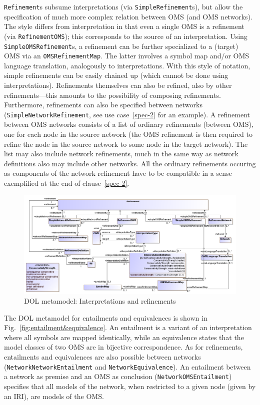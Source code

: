 \documentclass[10pt, a4paper]{isov2}
\newcommand*{\syntax}[1]{\texttt{#1}}
\begin{document}
\syntax{Refinement}s subsume interpretations (via
\syntax{SimpleRefinement}s), but allow the specification of much more
complex relation between OMS (and OMS networks).  The style differs
from interpretation in that even a single OMS is a refinement (via
\syntax{RefinementOMS}); this corresponds to the source of an
interpretation. Using \syntax{SimpleOMSRefinement}s, a refinement can
be further specialized to a (target) OMS via an
\syntax{OMSRefinementMap}. The latter involves a symbol map and/or OMS
language translation, analogously to interpretations.  With this style
of notation, simple refinements can be easily chained up (which cannot
be done using interpretations).  Refinements themselves can
also be refined, also by other refinements---this amounts
to the possibility of composing refinements. Furthermore,
refinements can also be specified between networks
(\syntax{SimpleNetworkRefinement}, see use case~\ref{spec-2} for an example).  
A refinement between OMS networks
consists of a list of ordinary refinements (between OMS), one for
each node in the source network (the OMS refinement is then required
to refine the node in the source network to some node in the target
network). The list may also include network refinements, much in the
same way as network definitions also may include other networks.
All the ordinary refinements occuring as components of the
network refinement have to be compatible in a sense exemplified
at the end of clause~\ref{spec-2}.

\medskip
\begin{figure}
  \centering
    \includegraphics[scale=0.42]{mof/interpretations&refinements.png}
  \caption{DOL metamodel: Interpretations and refinements}
  \label{fig:interpretations&refinements}
\end{figure}

The DOL metamodel for entailments and equivalences is shown in 
Fig.~\ref{fig:entailment&equivalence}.
An entailment is a variant of an interpretation where all symbols are
mapped identically, while an equivalence states that the model classes
of two OMS are in bijective correspondence. As for refinements,
entailments and equivalences are also possible between networks
(\syntax{NetworkNetworkEntailment} and \syntax{NetworkEquivalence}).
An entailment between a network as premise and an OMS as conclusion
(\syntax{NetworkOMSEntailment}) specifies that all models of the
network, when restricted to a given node (given by an IRI), are
models of the OMS.
\end{document}
